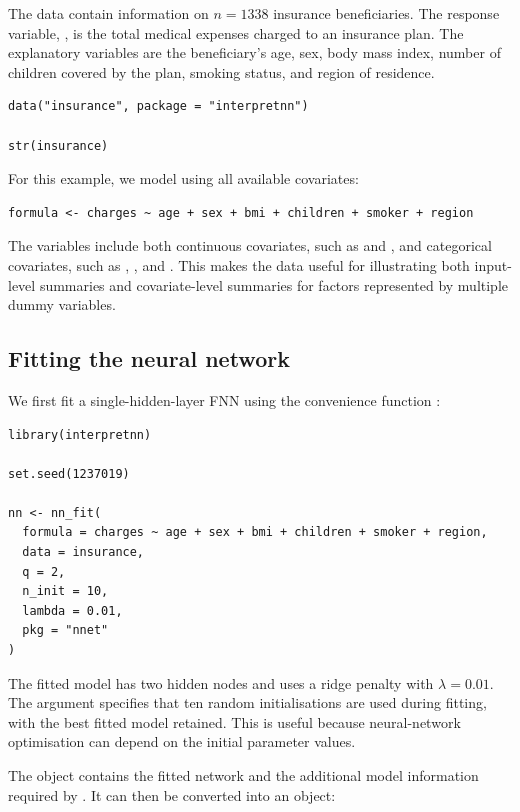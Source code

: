 The data contain information on \(n = 1338\) insurance beneficiaries.
The response variable, , is the total medical expenses charged to an insurance plan.
The explanatory variables are the beneficiary's age, sex, body mass index, number of children covered by the plan, smoking status, and region of residence.

\begin{verbatim}
data("insurance", package = "interpretnn")

str(insurance)
\end{verbatim}

For this example, we model  using all available covariates:

\begin{verbatim}
formula <- charges ~ age + sex + bmi + children + smoker + region
\end{verbatim}

The variables include both continuous covariates, such as  and , and categorical covariates, such as , , and .
This makes the data useful for illustrating both input-level summaries and covariate-level summaries for factors represented by multiple dummy variables.

\subsection{Fitting the neural network}\label{fitting-the-neural-network}

We first fit a single-hidden-layer FNN using the convenience function :

\begin{verbatim}
library(interpretnn)

set.seed(1237019)

nn <- nn_fit(
  formula = charges ~ age + sex + bmi + children + smoker + region,
  data = insurance,
  q = 2,
  n_init = 10,
  lambda = 0.01,
  pkg = "nnet"
)
\end{verbatim}

The fitted model has two hidden nodes and uses a ridge penalty with \(\lambda = 0.01\).
The argument  specifies that ten random initialisations are used during fitting, with the best fitted model retained.
This is useful because neural-network optimisation can depend on the initial parameter values.

The object  contains the fitted network and the additional model information required by .
It can then be converted into an  object:

